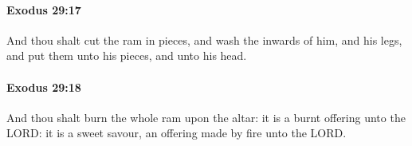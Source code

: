 		\paragraph{Exodus 29:17} %
			\label{EXODUS-29-17}

			And thou shalt cut the ram in pieces, and wash the inwards of him, and his legs, and put them unto his pieces, and unto his head.


		\paragraph{Exodus 29:18} %
			\label{EXODUS-29-18}

			And thou shalt burn the whole ram upon the altar: it is a burnt offering unto the LORD: it is a sweet savour, an offering made by fire unto the LORD.


